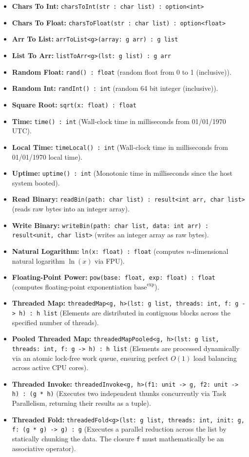 \documentclass[11pt, a4paper]{article}
\begin{document}
\begin{itemize}
    \item \textbf{Chars To Int: } \texttt{charsToInt(str : char list) : option<int>}
    \item \textbf{Chars To Float: } \texttt{charsToFloat(str : char list) : option<float>}
    \item \textbf{Arr To List: } \texttt{arrToList<g>(array: g arr) : g list}
    \item \textbf{List To Arr: } \texttt{listToArr<g>(lst: g list) : g arr}
    \item \textbf{Random Float: } \texttt{rand() : float} (random float from 0 to 1 (inclusive)).
    \item \textbf{Random Int:} \texttt{randInt() : int} (random 64 bit integer (inclusive)).
    \item \textbf{Square Root:} \texttt{sqrt(x: float) : float}
    \item \textbf{Time:} \texttt{time() : int} (Wall-clock time in milliseconds from 01/01/1970 UTC).
    \item \textbf{Local Time: } \texttt{timeLocal() : int} (Wall-clock time in milliseconds from 01/01/1970 local time).
    \item \textbf{Uptime:} \texttt{uptime() : int} (Monotonic time in milliseconds since the host system booted).
    \item \textbf{Read Binary:} \texttt{readBin(path: char list) : result<int arr, char list>} (reads raw bytes into an integer array).
    \item \textbf{Write Binary:} \texttt{writeBin(path: char list, data: int arr) : result<unit, char list>} (writes an integer array as raw bytes).
    \item \textbf{Natural Logarithm:} \texttt{ln(x: float) : float} (computes $n$-dimensional natural logarithm $\ln(x)$ via FPU).
    \item \textbf{Floating-Point Power:} \texttt{pow(base: float, exp: float) : float} (computes floating-point exponentiation $\text{base}^{\text{exp}}$).
    \item \textbf{Threaded Map:} \texttt{threadedMap<g, h>(lst: g list, threads: int, f: g -> h) : h list} 
    (Elements are distributed in contiguous blocks across the specified number of threads).
    \item \textbf{Pooled Threaded Map:} \texttt{threadedMapPooled<g, h>(lst: g list, threads: int, f: g -> h) : h list} 
(Elements are processed dynamically via an atomic lock-free work queue, ensuring perfect $O(1)$ load balancing across active CPU cores).
    \item \textbf{Threaded Invoke:} \texttt{threadedInvoke<g, h>(f1: unit -> g, f2: unit -> h) : (g * h)} 
    (Executes two independent thunks concurrently via Task Parallelism, returning their results as a tuple).
    \item \textbf{Threaded Fold:} \texttt{threadedFold<g>(lst: g list, threads: int, init: g, f: (g * g) -> g) : g} 
    (Executes a parallel reduction across the list by statically chunking the data. The closure \texttt{f} must mathematically be an associative operator).
\end{itemize}
\end{document}
